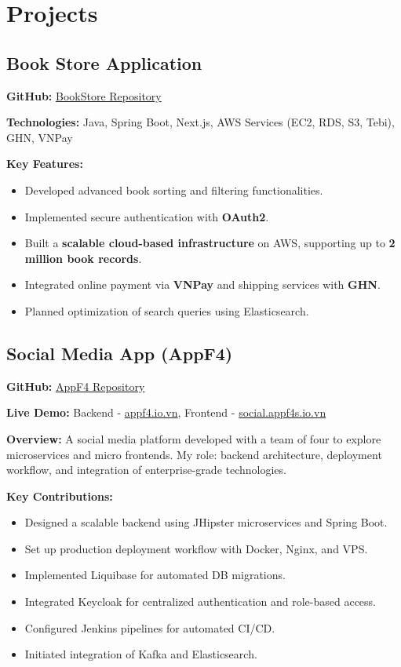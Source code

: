 \documentclass[11pt,a4paper]{article}
\begin{document}
\section{Projects}
\begin{adjustwidth}{2em}{}
\subsection{Book Store Application}

\textbf{GitHub:} \href{https://github.com/shegga9x/book-store-app}{BookStore Repository}

\textbf{Technologies:} Java, Spring Boot, Next.js, AWS Services (EC2, RDS, S3, Tebi), GHN, VNPay

\textbf{Key Features:}
\begin{itemize}[leftmargin=*]
    \item Developed advanced book sorting and filtering functionalities.
    \item Implemented secure authentication with \textbf{OAuth2}.
    \item Built a \textbf{scalable cloud-based infrastructure} on AWS, supporting up to \textbf{2 million book records}.
    \item Integrated online payment via \textbf{VNPay} and shipping services with \textbf{GHN}.
    \item Planned optimization of search queries using Elasticsearch.
\end{itemize}

\vspace{1em}

\subsection{Social Media App (AppF4)}

\textbf{GitHub:} \href{https://github.com/shegga9x/appf4}{AppF4 Repository}

\textbf{Live Demo:} Backend - \href{http://appf4.io.vn}{appf4.io.vn}, Frontend - \href{http://social.appf4s.io.vn}{social.appf4s.io.vn}

\textbf{Overview:} A social media platform developed with a team of four to explore microservices and micro frontends. My role: backend architecture, deployment workflow, and integration of enterprise-grade technologies.

\textbf{Key Contributions:}
\begin{itemize}[leftmargin=*]
    \item Designed a scalable backend using JHipster microservices and Spring Boot.
    \item Set up production deployment workflow with Docker, Nginx, and VPS.
    \item Implemented Liquibase for automated DB migrations.
    \item Integrated Keycloak for centralized authentication and role-based access.
    \item Configured Jenkins pipelines for automated CI/CD.
    \item Initiated integration of Kafka and Elasticsearch.
\end{itemize}


\end{adjustwidth}
\end{document}
